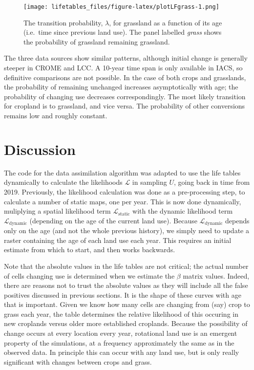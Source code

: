 \documentclass[
]{book}
\begin{document}
\begin{figure}
\centering
\texttt{[image: lifetables\_files/figure-latex/plotLFgrass-1.png]}
\caption{\label{fig:plotLFgrass}The transition probability, \(\lambda\), for grassland as a function of its age (i.e.~time since previous land use). The panel labelled \emph{grass} shows the probability of grassland remaining grassland.}
\end{figure}

The three data sources show similar patterns, although initial change is generally steeper in CROME and LCC. A 10-year time span is only available in IACS, so definitive comparisons are not possible. In the case of both crops and grasslands, the probability of remaining unchanged increases asymptotically with age; the probability of changing use decreases correspondingly. The most likely transition for cropland is to grassland, and vice versa. The probability of other conversions remains low and roughly constant.

\hypertarget{discussion-1}{%
\section{Discussion}\label{discussion-1}}

The code for the data assimilation algorithm was adapted to use the life tables dynamically to calculate the likelihoods \(\mathcal{L}\) in sampling \(U\), going back in time from 2019. Previously, the likelihood calculation was done as a pre-processing step, to calculate a number of static maps, one per year.
This is now done dynamically, muliplying a spatial likelihood term \(\mathcal{L}_\mathrm{static}\) with the dynamic likelihood term \(\mathcal{L}_\mathrm{dynamic}\) (depending on the age of the current land use). Because \(\mathcal{L}_\mathrm{dynamic}\) depends only on the age (and not the whole previous history), we simply need to update a raster containing the age of each land use each year. This requires an initial estimate from which to start, and then works backwards.

Note that the absolute values in the life tables are not critical; the actual number of cells changing use is determined when we estimate the \(\beta\) matrix values.
Indeed, there are reasons not to trust the absolute values as they will include all the false positives discussed in previous sections.
It is the shape of these curves with age that is important.
Given we know how many cells are changing from (say) crop to grass each year, the table determines the relative likelihood of this occuring in new croplands versus older more established croplands.
Because the possibility of change occurs at every location every year, rotational land use is an emergent property of the simulations, at a frequency approximately the same as in the observed data.
In principle this can occur with any land use, but is only really significant with changes between crops and grass.
\end{document}
